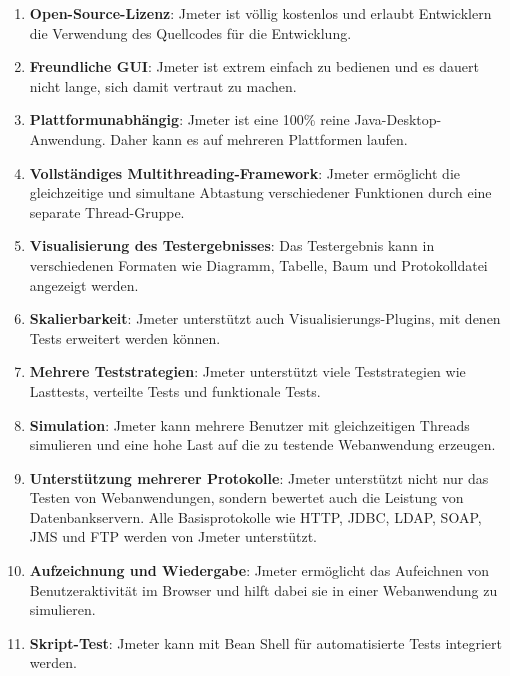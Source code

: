 \begin{enumerate}

    \item \textbf{Open-Source-Lizenz}: Jmeter ist völlig kostenlos und erlaubt
     Entwicklern die Verwendung des Quellcodes für die Entwicklung.

    \item \textbf{Freundliche GUI}: Jmeter ist extrem einfach zu bedienen und es
    dauert nicht lange, sich damit vertraut zu machen.

    \item \textbf{Plattformunabhängig}: Jmeter ist eine 100\% reine
    Java-Desktop-Anwendung. Daher kann es auf mehreren Plattformen laufen.

    \item \textbf{Vollständiges Multithreading-Framework}: Jmeter ermöglicht die
    gleichzeitige und simultane Abtastung verschiedener Funktionen durch
    eine separate Thread-Gruppe.

    \item \textbf{Visualisierung des Testergebnisses}: Das Testergebnis kann in
    verschiedenen Formaten wie Diagramm, Tabelle, Baum und Protokolldatei
    angezeigt werden.

    \item \textbf{Skalierbarkeit}: Jmeter  unterstützt auch Visualisierungs-Plugins,
    mit denen Tests erweitert werden können.

    \item \textbf{Mehrere Teststrategien}: Jmeter unterstützt viele
    Teststrategien wie Lasttests, verteilte Tests und funktionale Tests.

    \item \textbf{Simulation}: Jmeter kann mehrere Benutzer mit gleichzeitigen Threads
    simulieren und eine hohe Last auf die zu testende Webanwendung erzeugen.

    \item \textbf{Unterstützung mehrerer Protokolle}: Jmeter unterstützt nicht
    nur das Testen von Webanwendungen, sondern bewertet auch die
    Leistung von Datenbankservern. Alle Basisprotokolle wie HTTP, JDBC,
    LDAP, SOAP, JMS und FTP werden von Jmeter unterstützt.

    \item \textbf{Aufzeichnung und Wiedergabe}: Jmeter ermöglicht das Aufeichnen
    von Benutzeraktivität im Browser und hilft dabei sie in einer
    Webanwendung zu simulieren.

    \item \textbf{Skript-Test}: Jmeter kann mit Bean Shell für automatisierte Tests
    integriert werden.

\end{enumerate}

